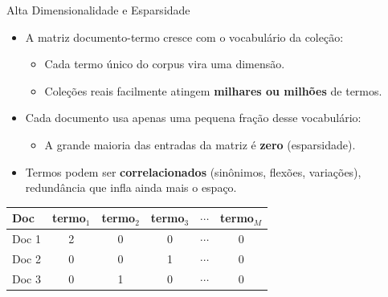 \documentclass[aspectratio=43]{beamer}
\begin{document}
\begin{frame}[t]{Alta Dimensionalidade e Esparsidade}

\vspace{0.3cm}

\begin{itemize}

    \item A matriz documento-termo cresce com o vocabulário da coleção:
    \begin{itemize}
        \item Cada termo único do corpus vira uma dimensão.
        \item Coleções reais facilmente atingem \textbf{milhares ou milhões} de termos.
    \end{itemize}

    \vspace{0.3cm}

    \item Cada documento usa apenas uma pequena fração desse vocabulário:
    \begin{itemize}
        \item A grande maioria das entradas da matriz é \textbf{zero} (esparsidade).
    \end{itemize}

    \vspace{0.3cm}

    \item Termos podem ser \textbf{correlacionados} (sinônimos, flexões, variações), redundância que infla ainda mais o espaço.

\end{itemize}

\vspace{0.3cm}

\begin{center}
\scriptsize
\begin{tabular}{lccccc}
\hline
\textbf{Doc} & termo$_1$ & termo$_2$ & termo$_3$ & $\cdots$ & termo$_M$ \\
\hline
Doc 1 & 2 & 0 & 0 & $\cdots$ & 0 \\
Doc 2 & 0 & 0 & 1 & $\cdots$ & 0 \\
Doc 3 & 0 & 1 & 0 & $\cdots$ & 0 \\
\hline
\end{tabular}
\end{center}

\vspace{0.2cm}


\end{frame}
\end{document}
